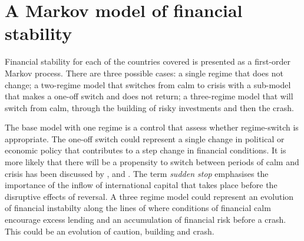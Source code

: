 \documentclass[12pt, a4paper, oneside]{article} %
\begin{document}

\section{A Markov model of financial stability}
Financial stability for each of the countries covered is presented as a first-order Markov process.  There are three possible cases:  a single regime that does not change; a two-regime model that switches from calm to crisis with a sub-model that makes a one-off switch and does not return; a three-regime model that will switch from calm, through the building of risky investments and then the crash.  

The base model with one regime is a control that assess whether regime-switch is appropriate.  The one-off switch could represent a single change in political or economic policy that contributes to a step change in financial conditions.  It is more likely that there will be a propensity to switch between periods of calm and crisis has been discussed by \citet{DornbuschSS}, \citet{CalvoSS} and \citet{KrugmanSS}.  The term \emph{sudden stop} emphasises the importance of the inflow of international capital that takes place before the disruptive effects of reversal.  A three regime model could represent an evolution of financial instabilty along the lines of \citet{MinskyStabilising, MinskyKeynes, MinskyFIH, MinskyLongerWaves} where conditions of financial calm encourage excess lending and an accumulation of financial risk before a crash.  This could be an evolution of caution, building and crash.  
\end{document}
